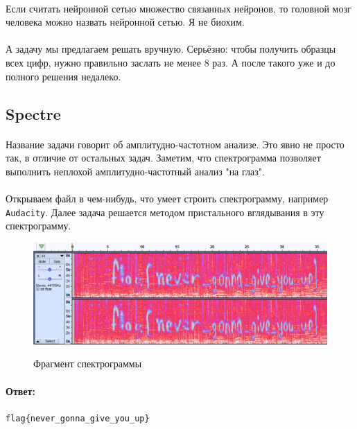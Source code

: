 \documentclass[12pt]{article}
\begin{document}
    \paragraph{}
    Если считать нейронной сетью множество связанных нейронов, то головной мозг человека можно назвать нейронной сетью.
    Я не биохим.
    \paragraph{}
    А задачу мы предлагаем решать вручную.
    Серьёзно: чтобы получить образцы всех цифр, нужно правильно заслать не менее 8 раз.
    А после такого уже и до полного решения недалеко.

    \subsection{Spectre}
    \paragraph{}
    Название задачи говорит об амплитудно-частотном анализе.
    Это явно не просто так, в отличие от остальных задач.
    Заметим, что спектрограмма позволяет выполнить неплохой амплитудно-частотный анализ "на глаз".
    \paragraph{}
    Открываем файл в чем-нибудь, что умеет строить спектрограмму, например \verb|Audacity|.
    Далее задача решается методом пристального вглядывания в эту спектрограмму.
    \begin{figure}[H]
        \centering
        \includegraphics[width=\linewidth]{task44}
        \label{fig:task44}
        \caption{Фрагмент спектрограммы}
    \end{figure}
    \paragraph{Ответ:}
    \verb|flag{never_gonna_give_you_up}|
\end{document}
